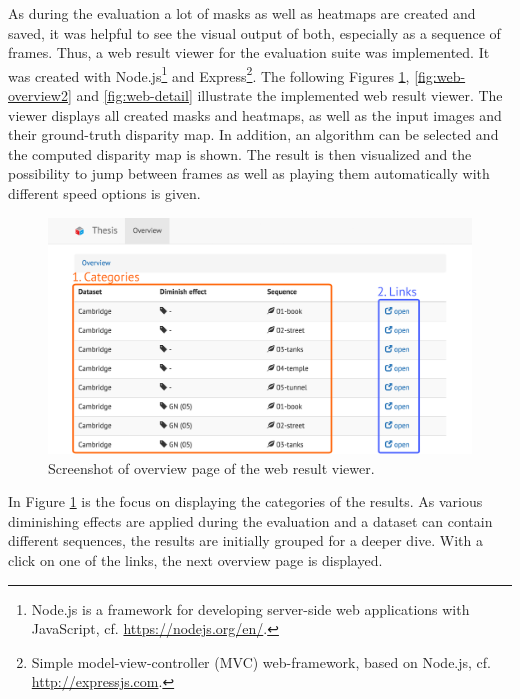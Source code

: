 As during the evaluation a lot of masks as well as heatmaps are created and saved, it was helpful to see the visual output of both, especially as a sequence of frames.
Thus, a web result viewer for the evaluation suite was implemented.
It was created with Node.js\footnote{Node.js is a framework for developing server-side web applications with JavaScript, cf. \url{https://nodejs.org/en/}.} and Express\footnote{Simple model-view-controller (MVC) web-framework, based on Node.js, cf. \url{http://expressjs.com}.}.
\newline\newline\noindent The following Figures \ref{fig:web-overview}, \ref{fig:web-overview2} and \ref{fig:web-detail} illustrate the implemented web result viewer.
The viewer displays all created masks and heatmaps, as well as the input images and their ground-truth disparity map.
In addition, an algorithm can be selected and the computed disparity map is shown.
The result is then visualized and the possibility to jump between frames as well as playing them automatically with different speed options is given.

\begin{figure}[h!]
  \centering
  \includegraphics[width=1.0\textwidth]{src/images/result-viewer-overview.png}
  \caption[Screenshot of overview page of the web result viewer]{Screenshot of overview page of the web result viewer.}
  \label{fig:web-overview}
\end{figure}

\noindent In Figure \ref{fig:web-overview} is the focus on displaying the categories of the results.
As various diminishing effects are applied during the evaluation and a dataset can contain different sequences, the results are initially grouped for a deeper dive.
With a click on one of the links, the next overview page is displayed.

